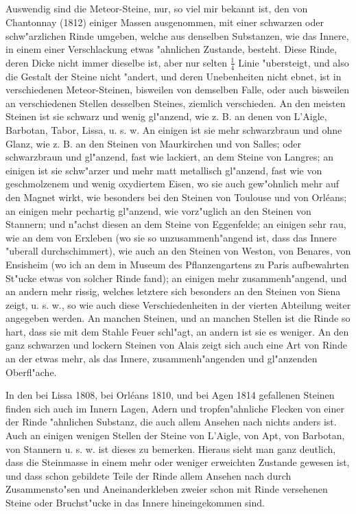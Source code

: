 \documentclass[a4paper, 11pt, oneside, polutonikogreek, german]{article}
\begin{document}
\subsection{}
\paragraph{}
Auswendig sind die Meteor-Steine, nur, so viel mir bekannt ist, den von Chantonnay (1812) einiger Massen ausgenommen, mit einer schwarzen oder schw"arzlichen Rinde umgeben, welche aus denselben Substanzen, wie das Innere, in einem einer Verschlackung etwas "ahnlichen Zustande, besteht. Diese Rinde, deren Dicke nicht immer dieselbe ist, aber nur selten $\mathfrak{\frac{1}{4}}$ Linie "ubersteigt, und also die Gestalt der Steine nicht "andert, und deren Unebenheiten nicht ebnet, ist in verschiedenen Meteor-Steinen, bisweilen von demselben Falle, oder auch bisweilen an verschiedenen Stellen desselben Steines, ziemlich verschieden. An den meisten Steinen ist sie schwarz und wenig gl"anzend, wie z. B. an denen von L'Aigle, Barbotan, Tabor, Lissa, u. s. w. An einigen ist sie mehr schwarzbraun und ohne Glanz, wie z. B. an den Steinen von Maurkirchen und von Salles; oder schwarzbraun und gl"anzend, fast wie lackiert, an dem Steine von Langres; an einigen ist sie schw"arzer und mehr matt metallisch gl"anzend, fast wie von geschmolzenem und wenig oxydiertem Eisen, wo sie auch gew"ohnlich mehr auf den Magnet wirkt, wie besonders bei den Steinen von Toulouse und von Orléans; an einigen mehr pechartig gl"anzend, wie vorz"uglich an den Steinen von Stannern; und n"achst diesen an dem Steine von Eggenfelde; an einigen sehr rau, wie an dem von Erxleben (wo sie so unzusammenh"angend ist, dass das Innere "uberall durchschimmert), wie auch an den Steinen von Weston, von Benares, von Ensisheim (wo ich an dem in Museum des Pflanzengartens zu Paris aufbewahrten St"ucke etwas von solcher Rinde fand); an einigen mehr zusammenh"angend, und an andern mehr rissig, welches letztere sich besonders an den Steinen von Siena zeigt, u. s. w., so wie auch diese Verschiedenheiten in der vierten Abteilung weiter angegeben werden. An manchen Steinen, und an manchen Stellen ist die Rinde so hart, dass sie mit dem Stahle Feuer schl"agt, an andern ist sie es weniger. An den ganz schwarzen und lockern Steinen von Alais zeigt sich auch eine Art von Rinde an der etwas mehr, als das Innere, zusammenh"angenden und gl"anzenden Oberfl"ache.

In den bei Lissa 1808, bei Orléans 1810, und bei Agen 1814 gefallenen Steinen finden sich auch im Innern Lagen, Adern und tropfen"ahnliche Flecken von einer der Rinde "ahnlichen Substanz, die auch allem Ansehen nach nichts anders ist. Auch an einigen wenigen Stellen der Steine von L'Aigle, von Apt, von Barbotan, von Stannern u. s. w. ist dieses zu bemerken. Hieraus sieht man ganz deutlich, dass die Steinmasse in einem mehr oder weniger erweichten Zustande gewesen ist, und dass schon gebildete Teile der Rinde allem Ansehen nach durch Zusammensto"sen und Aneinanderkleben zweier schon mit Rinde versehenen Steine oder Bruchst"ucke in das Innere hineingekommen sind.
\end{document}

